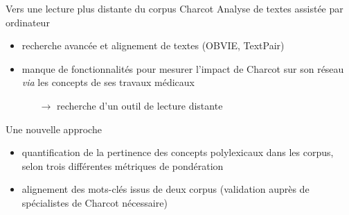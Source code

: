 \begin{frame}{Vers une lecture plus distante du corpus Charcot}
Analyse de textes assistée par ordinateur
    \begin{itemize}
        \item recherche avancée et alignement de textes (OBVIE, TextPair)
        \begingroup 
{}
\endgroup
        \item manque de fonctionnalités pour mesurer l’impact de Charcot sur son réseau \textit{via} les concepts de ses travaux médicaux 
        \begin{itemize}
        \item[$\rightarrow$] recherche d'un outil de \og{}lecture distante\fg{}
        \end{itemize}
    \end{itemize}
    \begin{block}{Une nouvelle approche}
        \begin{itemize}
    \item quantification de la pertinence des concepts polylexicaux dans les corpus, selon trois différentes métriques de pondération
    \item alignement des mots-clés issus de deux corpus (validation auprès de
spécialistes de Charcot nécessaire)
\end{itemize}
    \end{block}
\end{frame}

